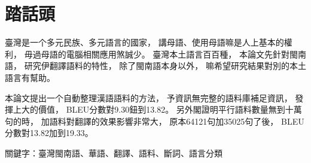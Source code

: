 \chapter{踏話頭}
臺灣是一个多元民族、多元語言的國家，
講母語、使用母語嘛是人上基本的權利，
毋過母語的電腦相關應用煞誠少。
臺灣本土語言百百種，
本論文先針對閩南語，
研究伊翻譯語料的特性，
除了閩南語本身以外，
嘛希望研究結果對別的本土語言有幫助。

本論文提出一个自動整理漢語語料的方法，
予資訊無完整的語料庫補足資訊，
發揮上大的價值，
BLEU分數對9.30鈕到13.82。
另外閣證明平行語料數量無到十萬句的時，
加語料對翻譯的效果影響非常大，
原本64121句加35025句了後，
BLEU分數對13.82加到19.33。

關鍵字：臺灣閩南語、華語、翻譯、語料、斷詞、語言分類
